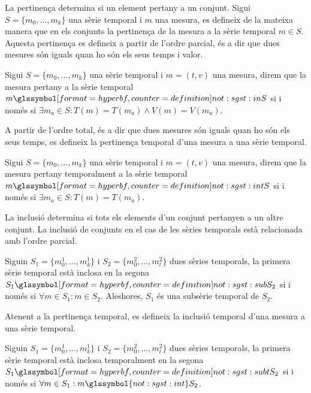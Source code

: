 La pertinença determina si un element pertany a un conjunt.  Sigui
$S=\{m_0,\ldots,m_k\}$ una sèrie temporal i $m$ una mesura, es
defineix de la mateixa manera que en els conjunts la pertinença de la
mesura a la sèrie temporal $m \in S$. Aquesta pertinença es defineix a
partir de l'ordre parcial, és a dir que dues mesures són iguals quan
ho són els seus temps i valor.
\begin{definition}[Pertinença]
  Sigui $S=\{m_0,\ldots,m_k\}$ una sèrie temporal i $m=(t,v)$ una
  mesura, direm que la mesura pertany a la sèrie temporal
  $m \glssymboldef{not:sgst:in} S$ si i només si $\exists m_a \in S :
  T(m) = T(m_a) \wedge V(m) = V(m_a)$.
\end{definition}




A partir de l'ordre total, és a dir que dues mesures són iguals quan
ho són els seus temps, es defineix la pertinença temporal d'una mesura
a una sèrie temporal.
\begin{definition}
  Sigui $S=\{m_0,\ldots,m_k\}$ una sèrie temporal i $m=(t,v)$ una
  mesura, direm que la mesura pertany temporalment a la sèrie temporal
  $m \glssymboldef{not:sgst:int} S$ si i només si $\exists m_a \in S :
  T(m) = T(m_a)$.
\end{definition}



La inclusió determina si tots els elements d'un conjunt pertanyen a un
altre conjunt. La inclusió de conjunts en el cas de les sèries
temporals està relacionada amb l'ordre parcial.
\begin{definition}[Inclusió]
  Siguin $S_1=\{m_0^1,\ldots,m_k^1\}$ i $S_2=\{m_0^2,\ldots,m_l^2\}$
  dues sèries temporals, la primera sèrie temporal està inclosa en la
  segona $S_1 \glssymboldef{not:sgst:sub} S_2$ si i només si $\forall
  m \in S_1: m \in S_2$. Aleshores, $S_1$ és una subsèrie temporal de
  $S_2$.
\end{definition}





Atenent a la pertinença temporal, es defineix la inclusió temporal
d'una mesura a una sèrie temporal.
\begin{definition}
  Siguin $S_1=\{m_0^1,\ldots,m_k^1\}$ i $S_2=\{m_0^2,\ldots,m_l^2\}$
  dues sèries temporals, la primera sèrie temporal està inclosa
  temporalment en la segona $S_1 \glssymboldef{not:sgst:subt} S_2$ si
  i només si $\forall m \in S_1: m \glssymbol{not:sgst:int} S_2$.
\end{definition}




